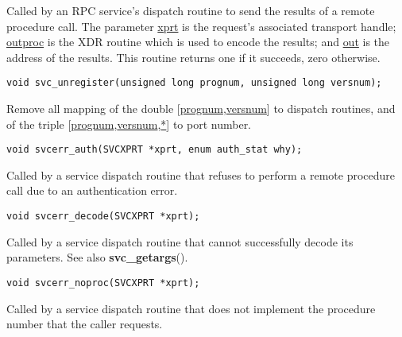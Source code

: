 \documentclass[]{article}
\let\realtextbf=\textbf
\renewcommand{\textbf}[1]{\textcolor{boldcolor}{\realtextbf{#1}}}
\renewcommand{\emph}[1]{\underline{#1}}
\begin{document}
\begin{description}
\itemsep1pt\parskip0pt
\item[]
Called by an RPC service's dispatch routine to send the results of a
remote procedure call. The parameter \emph{xprt} is the request's
associated transport handle; \emph{outproc} is the XDR routine which is
used to encode the results; and \emph{out} is the address of the
results. This routine returns one if it succeeds, zero otherwise.
\end{description}

\begin{verbatim}
void svc_unregister(unsigned long prognum, unsigned long versnum);
\end{verbatim}

\begin{description}
\itemsep1pt\parskip0pt
\item[]
Remove all mapping of the double {[}\emph{prognum},\emph{versnum}{]} to
dispatch routines, and of the triple
{[}\emph{prognum},\emph{versnum},\emph{*}{]} to port number.
\end{description}

\begin{verbatim}
void svcerr_auth(SVCXPRT *xprt, enum auth_stat why);
\end{verbatim}

\begin{description}
\itemsep1pt\parskip0pt
\item[]
Called by a service dispatch routine that refuses to perform a remote
procedure call due to an authentication error.
\end{description}

\begin{verbatim}
void svcerr_decode(SVCXPRT *xprt);
\end{verbatim}

\begin{description}
\itemsep1pt\parskip0pt
\item[]
Called by a service dispatch routine that cannot successfully decode its
parameters. See also \textbf{svc\_getargs}().
\end{description}

\begin{verbatim}
void svcerr_noproc(SVCXPRT *xprt);
\end{verbatim}

\begin{description}
\itemsep1pt\parskip0pt
\item[]
Called by a service dispatch routine that does not implement the
procedure number that the caller requests.
\end{description}
\end{document}

